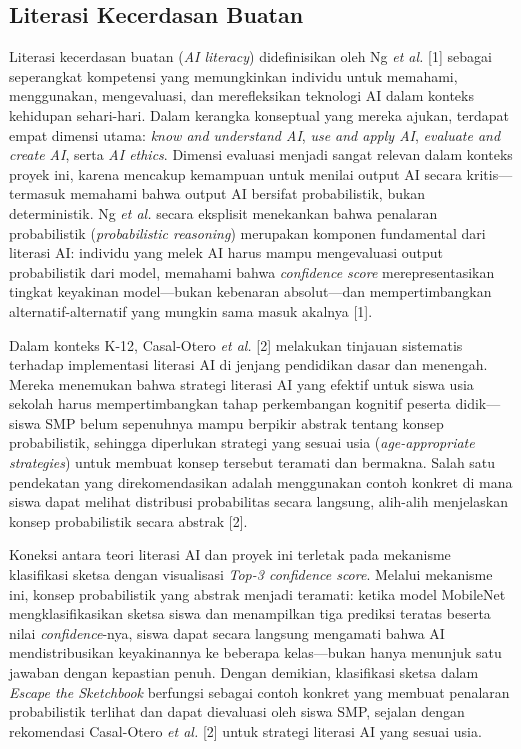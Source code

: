 \documentclass[12pt,oneside]{report}
\begin{document}
\subsection{Literasi Kecerdasan Buatan}
\label{subsec:literasi-kb}

Literasi kecerdasan buatan (\textit{AI literacy}) didefinisikan oleh Ng \textit{et al.} [1] sebagai seperangkat kompetensi yang memungkinkan individu untuk memahami, menggunakan, mengevaluasi, dan merefleksikan teknologi AI dalam konteks kehidupan sehari-hari. Dalam kerangka konseptual yang mereka ajukan, terdapat empat dimensi utama: \textit{know and understand AI}, \textit{use and apply AI}, \textit{evaluate and create AI}, serta \textit{AI ethics}. Dimensi evaluasi menjadi sangat relevan dalam konteks proyek ini, karena mencakup kemampuan untuk menilai output AI secara kritis—termasuk memahami bahwa output AI bersifat probabilistik, bukan deterministik. Ng \textit{et al.} secara eksplisit menekankan bahwa penalaran probabilistik (\textit{probabilistic reasoning}) merupakan komponen fundamental dari literasi AI: individu yang melek AI harus mampu mengevaluasi output probabilistik dari model, memahami bahwa \textit{confidence score} merepresentasikan tingkat keyakinan model—bukan kebenaran absolut—dan mempertimbangkan alternatif-alternatif yang mungkin sama masuk akalnya [1].

Dalam konteks K-12, Casal-Otero \textit{et al.} [2] melakukan tinjauan sistematis terhadap implementasi literasi AI di jenjang pendidikan dasar dan menengah. Mereka menemukan bahwa strategi literasi AI yang efektif untuk siswa usia sekolah harus mempertimbangkan tahap perkembangan kognitif peserta didik—siswa SMP belum sepenuhnya mampu berpikir abstrak tentang konsep probabilistik, sehingga diperlukan strategi yang sesuai usia (\textit{age-appropriate strategies}) untuk membuat konsep tersebut teramati dan bermakna. Salah satu pendekatan yang direkomendasikan adalah menggunakan contoh konkret di mana siswa dapat melihat distribusi probabilitas secara langsung, alih-alih menjelaskan konsep probabilistik secara abstrak [2].

Koneksi antara teori literasi AI dan proyek ini terletak pada mekanisme klasifikasi sketsa dengan visualisasi \textit{Top-3 confidence score}. Melalui mekanisme ini, konsep probabilistik yang abstrak menjadi teramati: ketika model MobileNet mengklasifikasikan sketsa siswa dan menampilkan tiga prediksi teratas beserta nilai \textit{confidence}-nya, siswa dapat secara langsung mengamati bahwa AI mendistribusikan keyakinannya ke beberapa kelas—bukan hanya menunjuk satu jawaban dengan kepastian penuh. Dengan demikian, klasifikasi sketsa dalam \textit{Escape the Sketchbook} berfungsi sebagai contoh konkret yang membuat penalaran probabilistik terlihat dan dapat dievaluasi oleh siswa SMP, sejalan dengan rekomendasi Casal-Otero \textit{et al.} [2] untuk strategi literasi AI yang sesuai usia.
\end{document}
